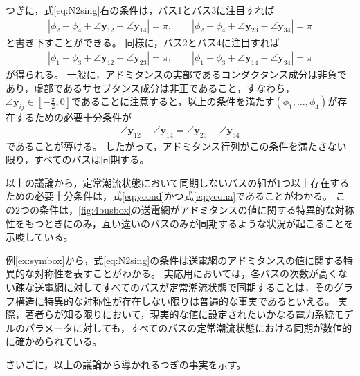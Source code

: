 \documentclass[tombow,dvipdfmx]{corona-a5-1.1}
\begin{document}
\begin{例}
つぎに，式\ref{eq:N2sing}右の条件は，バス1とバス3に注目すれば
\begin{align*}
|\phi_2 - \phi_4 + \angle \bm{y}_{12} - \angle \bm{y}_{14}|=\pi
,\qquad
|\phi_2 - \phi_4 + \angle \bm{y}_{23} - \angle \bm{y}_{34}|=\pi
\end{align*}
と書き下すことができる。
同様に，バス2とバス4に注目すれば
\begin{align*}
|\phi_1 - \phi_3 + \angle \bm{y}_{12} - \angle \bm{y}_{23}|=\pi
,\qquad
|\phi_1 - \phi_3 + \angle \bm{y}_{14} - \angle \bm{y}_{34}|=\pi
\end{align*}
が得られる。
一般に，アドミタンスの実部であるコンダクタンス成分は非負であり，虚部であるサセプタンス成分は非正であること，すなわち，$\angle \bm{y}_{ij} \in \left[-\frac{\pi}{2},0 \right]$であることに注意すると，以上の条件を満たす$(\phi_1,\ldots,\phi_4)$が存在するための必要十分条件が
\begin{align}\label{eq:ycona}
\angle \bm{y}_{12} - \angle \bm{y}_{14}=
\angle \bm{y}_{23} - \angle \bm{y}_{34}
\end{align}
であることが導ける。
したがって，アドミタンス行列がこの条件を満たさない限り，すべてのバスは同期する。

以上の議論から，定常潮流状態において同期しないバスの組が1つ以上存在するための必要十分条件は，式\ref{eq:ycond}かつ式\ref{eq:ycona}であることがわかる。
この2つの条件は，\ref{fig:4busbox}の送電網がアドミタンスの値に関する特異的な対称性をもつときにのみ，互い違いのバスのみが同期するような状況が起こることを示唆している。
\end{例}

例\ref{ex:symbox}から，式\ref{eq:N2sing}の条件は送電網のアドミタンスの値に関する特異的な対称性を表すことがわかる。
実応用においては，各バスの次数が高くない疎な送電網に対してすべてのバスが定常潮流状態で同期することは，そのグラフ構造に特異的な対称性が存在しない限りは普遍的な事実であるといえる。
実際，著者らが知る限りにおいて，現実的な値に設定されたいかなる電力系統モデルのパラメータに対しても，すべてのバスの定常潮流状態における同期が数値的に確かめられている。


さいごに，以上の議論から導かれるつぎの事実を示す。
\end{document}
